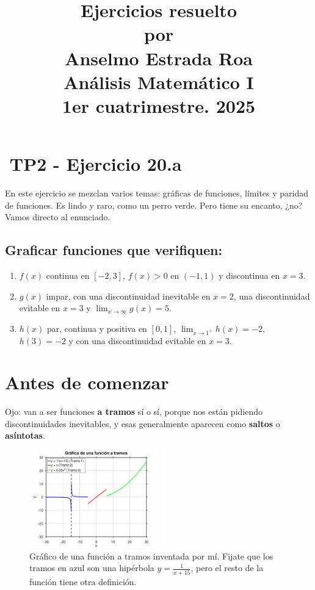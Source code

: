 \documentclass[12pt]{article}
\title{Ejercicios resuelto\\por\\Anselmo Estrada Roa\\Análisis Matemático I\\1er cuatrimestre. 2025}
\date{}
\let\oldincludegraphics\includegraphics
\renewcommand{\includegraphics}[2][]{%
  \oldincludegraphics[width=0.5\textwidth,#1]{#2}%
}
\begin{document}
\maketitle

\section*{{\emojifont 📘}TP2 - Ejercicio 20.a}
En este ejercicio se mezclan varios temas: gráficas de funciones, límites y paridad de funciones. Es lindo y raro, como un perro verde. Pero tiene su encanto, ¿no? Vamos directo al enunciado.

\subsection*{Graficar funciones que verifiquen:}
\begin{enumerate}
  \item $f(x)$ continua en $[-2, 3]$, $f(x) > 0$ en $(-1, 1)$ y discontinua en $x = 3$.
  \item $g(x)$ impar, con una discontinuidad inevitable en $x = 2$, una discontinuidad evitable en $x = 3$ y $\lim_{x \to \infty} g(x) = 5$.
  \item $h(x)$ par, continua y positiva en $[0, 1]$, $\lim_{x \to 1^+} h(x) = -2$, $h(3) = -2$ y con una discontinuidad evitable en $x = 3$.
\end{enumerate}

\section*{Antes de comenzar}
Ojo: van a ser funciones \textbf{a tramos} sí o sí, porque nos están pidiendo discontinuidades inevitables, y esas generalmente aparecen como \textbf{saltos} o \textbf{asíntotas}.

\begin{figure}[H]
  \centering
  \includegraphics{img/f(x)-a-tramos.png}
  \caption{Gráfico de una función a tramos inventada por mí. Fijate que los tramos en azul son una hipérbola $y = \frac{1}{x+15}$, pero el resto de la función tiene otra definición.}
\end{figure}
\end{document}
